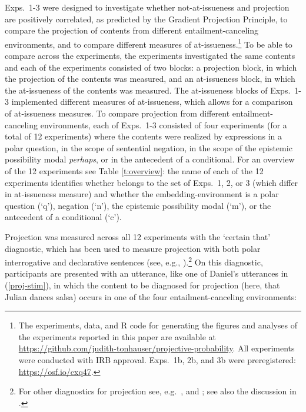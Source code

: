 \documentclass[11pt,fleqn]{article}
\newcommand{\6}{\mbox{$[\hspace*{-.6mm}[$}}
\newcommand{\9}{\mbox{$]\hspace*{-.6mm}]$}}
\begin{document}
Exps.~1-3 were designed to investigate whether not-at-issueness and projection are positively correlated, as predicted by the Gradient Projection Principle, to compare the projection of contents from different entailment-canceling environments, and to compare different measures of at-issueness.\footnote{\label{f-github}The experiments, data, and R code for generating the figures and analyses of the experiments reported in this paper are available at \url{https://github.com/judith-tonhauser/projective-probability}. All experiments were conducted with IRB approval. Exps.~1b, 2b, and 3b were preregistered: \url{https://osf.io/cxq47}.} To be able to compare across the experiments, the experiments investigated the same contents and each of the experiments consisted of two blocks: a projection block, in which the projection of the contents was measured, and an at-issueness block, in which the at-issueness of the contents was measured. The at-issueness blocks of Exps.~1-3 implemented different measures of at-issueness, which allows for a comparison of at-issueness measures. To compare projection from different entailment-canceling environments, each of Exps.~1-3 consisted of four experiments (for a total of 12 experiments) where the contents were realized by expressions in a polar question, in the scope of sentential negation, in the scope of the epistemic possibility modal {\em perhaps}, or in the antecedent of a conditional. For an overview of the 12 experiments see Table \ref{t:overview}: the name of each of the 12 experiments identifies whether belongs to the set of Exps.~1, 2, or 3 (which differ in at-issueness measure) and whether the embedding-environment is a polar question (`q'), negation (`n'), the epistemic possibility modal (`m'), or the antecedent of a conditional (`c').

Projection was measured across all 12 experiments with the `certain that' diagnostic, which has been used to measure projection with both polar interrogative and declarative sentences (see, e.g., \citealt{tonhauser-salt26,djaerv-bacovcin-salt27,stevens-etal2017,lorson2018,tbd-variability,mahler-nels,mahler2020,demarneffe-etal-sub23}).\footnote{For other diagnostics for projection see, e.g.\ \citealt{smith-hall11,xue-onea11}, and \citealt{brst-lang11}; see also the discussion in \citealt{tbd-variability}.}  On this diagnostic, participants are presented with an utterance, like one of Daniel's utterances in (\ref{proj-stim}), in which the content to be diagnosed for projection (here, that Julian dances salsa) occurs in one of the four entailment-canceling environments:
\end{document}
